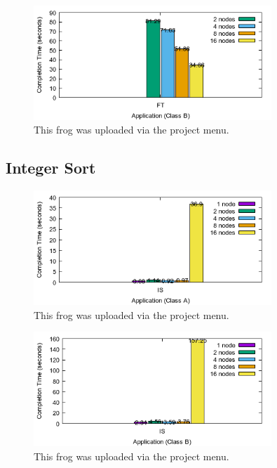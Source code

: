 \documentclass[a4paper]{article}
\begin{document}
\begin{figure}[H]
\centering
\includegraphics[width=0.8\textwidth]{figures/FTvB.png}
\caption{\label{fig:FTvB}This frog was uploaded via the project menu.}
\end{figure}

\subsection{Integer Sort}

\begin{figure}[H]
\centering
\includegraphics[width=0.8\textwidth]{figures/ISvA.png}
\caption{\label{fig:ISvA}This frog was uploaded via the project menu.}
\end{figure}

\begin{figure}[H]
\centering
\includegraphics[width=0.8\textwidth]{figures/ISvB.png}
\caption{\label{fig:ISvB}This frog was uploaded via the project menu.}
\end{figure}
\end{document}
